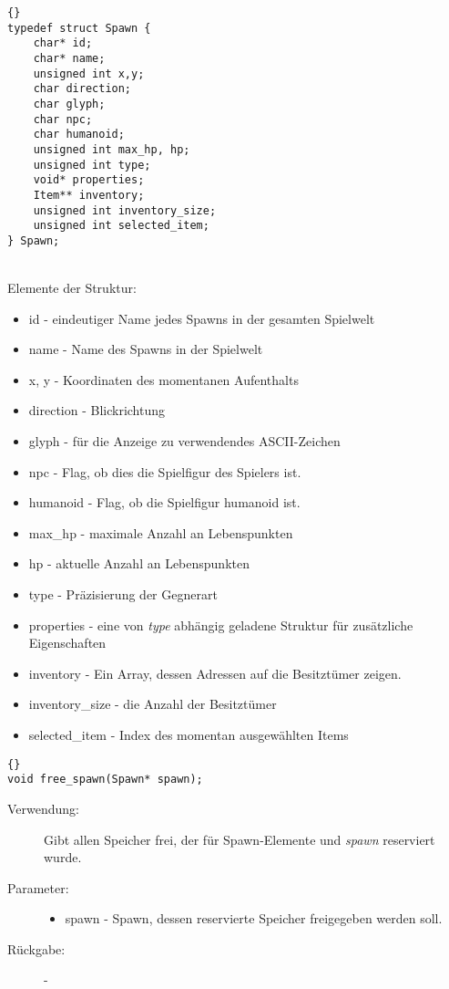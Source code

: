 \documentclass[11pt,a4paper,notitlepage]{report}
\begin{document}
	\begin{lstlisting}[caption=Spawn]{}
typedef struct Spawn {
	char* id;
	char* name;
	unsigned int x,y;
	char direction;
	char glyph;
	char npc;
	char humanoid;
	unsigned int max_hp, hp;
	unsigned int type;
	void* properties;
	Item** inventory;
	unsigned int inventory_size;
	unsigned int selected_item;
} Spawn;
		\end{lstlisting} \hspace*{\fill} \\
Elemente der Struktur:
		\begin{itemize}
			\item id - eindeutiger Name jedes Spawns in der gesamten Spielwelt
			\item name - Name des Spawns in der Spielwelt
			\item x, y - Koordinaten des momentanen Aufenthalts
			\item direction - Blickrichtung
			\item glyph - für die Anzeige zu verwendendes ASCII-Zeichen
			\item npc - Flag, ob dies die Spielfigur des Spielers ist.
			\item humanoid - Flag, ob die Spielfigur humanoid ist.
			\item max\_hp - maximale Anzahl an Lebenspunkten
			\item hp - aktuelle Anzahl an Lebenspunkten
			\item type - Präzisierung der Gegnerart
			\item properties - eine von \textit{type} abhängig geladene Struktur für zusätzliche Eigenschaften
			\item inventory - Ein Array, dessen Adressen auf die Besitztümer zeigen.
			\item inventory\_size - die Anzahl der Besitztümer
			\item selected\_item - Index des momentan ausgewählten Items
		\end{itemize}
		
		\begin{lstlisting}[caption=free\_spawn]{}
void free_spawn(Spawn* spawn);
		\end{lstlisting}
		
	\begin{description}
		\item[Verwendung:] Gibt allen Speicher frei, der für Spawn-Elemente und \textit{spawn} reserviert wurde.
		\item[Parameter:] \hfill
		\begin{itemize}
			\item spawn - Spawn, dessen reservierte Speicher freigegeben werden soll.
		\end{itemize}
		\item[Rückgabe:] -
	\end{description}
	
\end{document}
